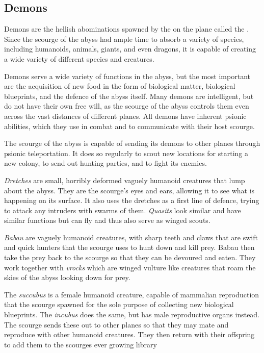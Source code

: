 \subsection{Demons}
\label{sec:Demons}

Demons are the hellish abominations spawned by the  on
the plane called the . Since the scourge of the abyss had
ample time to absorb a variety of species, including humanoids, animals, giants,
and even dragons, it is capable of creating a wide variety of different species
and creatures.

Demons serve a wide variety of functions in the abyss, but the most important
are the acquisition of new food in the form of biological matter, biological
blueprints, and the defence of the abyss itself. Many demons are intelligent,
but do not have their own free will, as the scourge of the abyss controls them
even across the vast distances of different planes. All demons have inherent
psionic abilities, which they use in combat and to communicate with their host
scourge.

The scourge of the abyss is capable of sending its demons to other planes
through psionic teleportation. It does so regularly to scout new locations for
starting a new colony, to send out hunting parties, and to fight its enemies.

\emph{Dretches} are small, horribly deformed vaguely humanoid creatures that
lump about the abyss. They are the scourge's eyes and ears, allowing it to
see what is happening on its surface. It also uses the dretches as a first
line of defence, trying to attack any intruders with swarms of them.
\emph{Quasits} look similar and have similar functions but can fly and
thus also serve as winged scouts.

\emph{Babau} are vaguely humanoid creatures, with sharp teeth and claws that
are swift and quick hunters that the scourge uses to hunt down and kill
prey. Babau then take the prey back to the scourge so that they can be
devoured and eaten. They work together with \emph{vrocks} which are winged
vulture like creatures that roam the skies of the abyss looking down for prey.

The \emph{succubus} is a female humanoid creature, capable of mammalian
reproduction that the scourge spawned for the sole purpose of collecting new
biological blueprints. The \emph{incubus} does the same, but has male
reproductive organs instead. The scourge sends these out to other planes
so that they may mate and reproduce with other humanoid creatures. They
then return with their offspring to add them to the scourges ever growing
library

